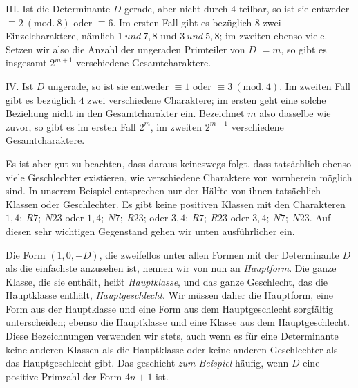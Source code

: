 III. Ist die Determinante $D$ gerade, aber nicht durch $4$ teilbar, so ist sie entweder $\equiv2\ (\mathrm{mod.}\ 8)$ oder $\equiv6$. Im ersten Fall gibt es bezüglich $8$ zwei Einzelcharaktere, nämlich $1\ \mathit{und}\ 7,8$ und $3\ \mathit{und}\ 5,8$; im zweiten ebenso viele. Setzen wir also die Anzahl der ungeraden Primteiler von $D$ $=m$, so gibt es insgesamt $2^{m+1}$ verschiedene Gesamtcharaktere.

IV. Ist $D$ ungerade, so ist sie entweder $\equiv1$ oder $\equiv3\ (\mathrm{mod.}\ 4)$. Im zweiten Fall gibt es bezüglich $4$ zwei verschiedene Charaktere; im ersten geht eine solche Beziehung nicht in den Gesamtcharakter ein. Bezeichnet $m$ also dasselbe wie zuvor, so gibt es im ersten Fall $2^m$, im zweiten $2^{m+1}$ verschiedene Gesamtcharaktere.

Es ist aber gut zu beachten, dass daraus keineswegs folgt, dass tatsächlich ebenso viele Geschlechter
existieren, wie verschiedene Charaktere von vornherein möglich sind. In unserem Beispiel entsprechen nur der Hälfte von ihnen tatsächlich Klassen oder Geschlechter. Es gibt keine positiven Klassen mit den Charakteren $1,4;\ R7;\ N23$ oder $1,4;\ N7;\ R23$; oder $3,4;\ R7;\ R23$ oder $3,4;\ N7;\ N23$. Auf diesen sehr wichtigen Gegenstand gehen wir unten ausführlicher ein.

Die Form $(1,0,-D)$, die zweifellos unter allen Formen mit der Determinante $D$ als die einfachste anzusehen ist, nennen wir von nun an \textit{Hauptform}. Die ganze Klasse, die sie enthält, heißt \textit{Hauptklasse}, und das ganze Geschlecht, das die Hauptklasse enthält, \textit{Hauptgeschlecht}. Wir müssen daher die Hauptform, eine Form aus der Hauptklasse und eine Form aus dem Hauptgeschlecht sorgfältig unterscheiden; ebenso die Hauptklasse und eine Klasse aus dem Hauptgeschlecht. Diese Bezeichnungen verwenden wir stets, auch wenn es für eine Determinante keine anderen Klassen als die Hauptklasse oder keine anderen Geschlechter als das Hauptgeschlecht gibt. Das geschieht \textit{zum Beispiel} häufig, wenn $D$ eine positive Primzahl der Form $4n+1$ ist.

